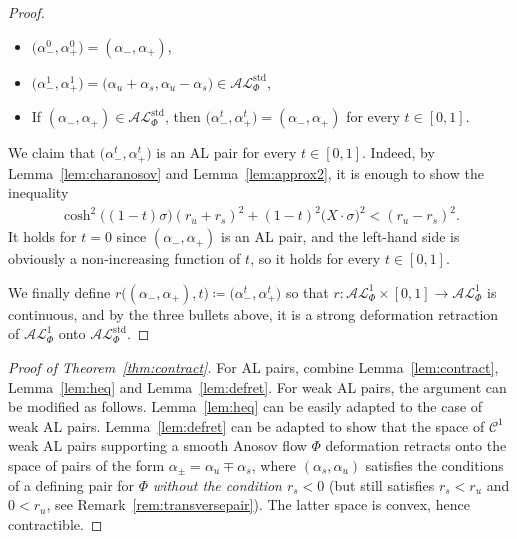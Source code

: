\documentclass[letterpaper, 11pt]{article}
\numberwithin{equation}{section}
\begin{document}
\begin{proof}
\begin{itemize}
\item $\big(\alpha^0_-, \alpha^0_+\big) = (\alpha_-, \alpha_+)$,
\item $\big(\alpha^1_-, \alpha^1_+\big) =  \big( \alpha_u + \alpha_s, \alpha_u - \alpha_s \big) \in \mathcal{AL}^\mathrm{std}_\Phi$,
\item If $(\alpha_-, \alpha_+) \in \mathcal{AL}^{\mathrm{std}}_\Phi$, then $\big(\alpha^t_-, \alpha^t_+\big) = (\alpha_-, \alpha_+)$ for every $t \in [0, 1]$.
\end{itemize}
 We claim that $\big(\alpha^t_-, \alpha^t_+\big)$ is an AL pair for every $t \in [0,1]$. Indeed, by Lemma~\ref{lem:charanosov} and Lemma~\ref{lem:approx2}, it is enough to show the inequality
\begin{align} \label{ineq:al2}
\cosh^2 \big((1-t)\sigma \big)(r_u + r_s )^2 + (1-t)^2 \big(X\cdot \sigma\big)^2 < (r_u-r_s)^2.
\end{align}
It holds for $t=0$ since $(\alpha_-, \alpha_+)$ is an AL pair, and the left-hand side is obviously a non-increasing function of $t$, so it holds for every $t \in [0,1]$.

We finally define $r\big((\alpha_-, \alpha_+), t\big) \coloneqq \big(\alpha^t_-, \alpha^t_+\big)$ so that $r : \mathcal{AL}^1_\Phi \times [0,1] \rightarrow \mathcal{AL}^1_\Phi$ is continuous, and by the three bullets above, it is a strong deformation retraction of $\mathcal{AL}^1_\Phi$ onto $\mathcal{AL}^{\mathrm{std}}_\Phi$.
\end{proof}

\begin{proof}[Proof of Theorem~\ref{thm:contract}] For AL pairs, combine Lemma~\ref{lem:contract}, Lemma~\ref{lem:heq} and Lemma~\ref{lem:defret}. For weak AL pairs, the argument can be modified as follows. Lemma~\ref{lem:heq} can be easily adapted to the case of weak AL pairs. Lemma~\ref{lem:defret} can be adapted to show that the space of $\mathcal{C}^1$ weak AL pairs supporting a smooth Anosov flow $\Phi$ deformation retracts onto the space of pairs of the form $\alpha_\pm = \alpha_u \mp \alpha_s$, where $(\alpha_s, \alpha_u)$ satisfies the conditions of a defining pair for $\Phi$ \emph{without the condition $r_s < 0$} (but still satisfies $r_s < r_u$ and $0<r_u$, see Remark~\ref{rem:transversepair}). The latter space is convex, hence contractible.
\end{proof}
\end{document}
